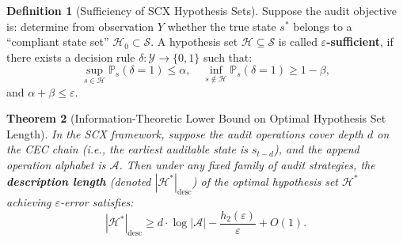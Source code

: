 \documentclass[12pt,a4paper]{article}
\theoremstyle{plain}
\newtheorem{theorem}{Theorem}[section]
\theoremstyle{definition}
\newtheorem{definition}[theorem]{Definition}
\begin{document}
\begin{definition}[Sufficiency of SCX Hypothesis Sets]
\label{def:sufficient_hypothesis}
Suppose the audit objective is: determine from observation $Y$ whether the true state $s^*$ belongs to a ``compliant state set'' $\mathcal{H}_0 \subset \mathcal{S}$.
A hypothesis set $\mathcal{H} \subseteq \mathcal{S}$ is called \textbf{$\varepsilon$-sufficient},
if there exists a decision rule $\delta: \mathcal{Y} \to \{0,1\}$ such that:
\[
\sup_{s \in \mathcal{H}} \mathbb{P}_s(\delta = 1) \leq \alpha, \quad
\inf_{s \notin \mathcal{H}} \mathbb{P}_s(\delta = 1) \geq 1 - \beta,
\]
and $\alpha + \beta \leq \varepsilon$.
\end{definition}

\begin{theorem}[Information-Theoretic Lower Bound on Optimal Hypothesis Set Length]
\label{thm:hypothesis_lb}
In the SCX framework, suppose the audit operations cover depth $d$ on the CEC chain (i.e., the earliest auditable state is $s_{t-d}$),
and the append operation alphabet is $\mathcal{A}$. Then under any fixed family of audit strategies,
the \textbf{description length} (denoted $|\mathcal{H}^*|_{\text{desc}}$) of the optimal hypothesis set $\mathcal{H}^*$ achieving $\varepsilon$-error satisfies:
\begin{equation}\label{eq:hypothesis_lb}
|\mathcal{H}^*|_{\text{desc}} \geq d \cdot \log|\mathcal{A}| - \frac{h_2(\varepsilon)}{\varepsilon} + O(1).
\end{equation}
\end{theorem}
\end{document}
